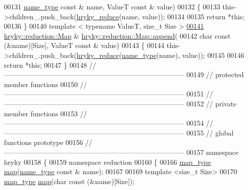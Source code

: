 \begin{DoxyCode}
00131     \hyperlink{classhryky_1_1reduction_1_1_string}{name_type} \textcolor{keyword}{const} & name, ValueT \textcolor{keyword}{const} & value)
00132 \{
00133     this->children\_.push\_back(\hyperlink{reduction__common_8h_afc72326c9900838c5db40438318794dd}{hryky_reduce}(name, value));
00134     
00135     \textcolor{keywordflow}{return} *\textcolor{keyword}{this};
00136 \}
00140 \textcolor{keyword}{template} < \textcolor{keyword}{typename} ValueT, \textcolor{keywordtype}{size\_t} Size >
\hypertarget{reduction__map_8h_source_l00141}{}\hyperlink{classhryky_1_1reduction_1_1_map_a60cd3dcac94e75366de4df28d580aad4}{00141} \hyperlink{classhryky_1_1reduction_1_1_map}{hryky::reduction::Map} & \hyperlink{classhryky_1_1reduction_1_1_map_a46fcabdd08327b7bdc4c72edb3623e7a}{hryky::reduction::Map::append}(
00142     \textcolor{keywordtype}{char} \textcolor{keyword}{const} (&name)[Size], ValueT \textcolor{keyword}{const} & value)
00143 \{
00144     this->children\_.push\_back(\hyperlink{reduction__common_8h_afc72326c9900838c5db40438318794dd}{hryky_reduce}(\hyperlink{namespacehryky_1_1reduction_ac686c30a4c8d196bbd0f05629a6b921f}{name_type}(name), value));
00145     
00146     \textcolor{keywordflow}{return} *\textcolor{keyword}{this};
00147 \}
00148 \textcolor{comment}{//
      ------------------------------------------------------------------------------}
00149 \textcolor{comment}{// protected member functions}
00150 \textcolor{comment}{//
      ------------------------------------------------------------------------------}
00151 \textcolor{comment}{//
      ------------------------------------------------------------------------------}
00152 \textcolor{comment}{// private member functions}
00153 \textcolor{comment}{//
      ------------------------------------------------------------------------------}
00154 \textcolor{comment}{//
      ------------------------------------------------------------------------------}
00155 \textcolor{comment}{// global functions prototype}
00156 \textcolor{comment}{//
      ------------------------------------------------------------------------------}
00157 \textcolor{keyword}{namespace }hryky
00158 \{
00159 \textcolor{keyword}{namespace }reduction
00160 \{
00166     \hyperlink{classhryky_1_1_intrusive_ptr}{map_type} \hyperlink{namespacehryky_1_1reduction_ac5eae270cf8047b294dc4ff3e5e11a79}{map}(\hyperlink{classhryky_1_1reduction_1_1_string}{name_type} \textcolor{keyword}{const} & name);
00167 
00169     \textcolor{keyword}{template} <\textcolor{keywordtype}{size\_t} Size>
00170     \hyperlink{classhryky_1_1_intrusive_ptr}{map_type} \hyperlink{namespacehryky_1_1reduction_ac5eae270cf8047b294dc4ff3e5e11a79}{map}(\textcolor{keywordtype}{char} \textcolor{keyword}{const} (&name)[Size]);

\end{DoxyCode}
